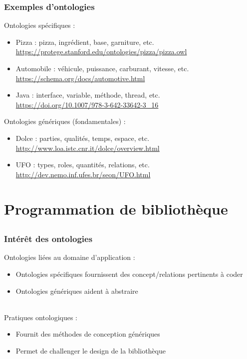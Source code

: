 \documentclass[draft]{beamer}
\begin{document}
\begin{frame}
\frametitle{Exemples d'ontologies}
Ontologies spécifiques :
\begin{itemize}
 \item Pizza : pizza, ingrédient, base, garniture, etc.\\
       {\scriptsize\url{https://protege.stanford.edu/ontologies/pizza/pizza.owl}}
 \item Automobile : véhicule, puissance, carburant, vitesse, etc.\\
       {\footnotesize\url{https://schema.org/docs/automotive.html}}
 \item Java : interface, variable, méthode, thread, etc.\\
       {\footnotesize\url{https://doi.org/10.1007/978-3-642-33642-3_16}}
\end{itemize}
Ontologies génériques (fondamentales) :
\begin{itemize}
 \item Dolce : parties, qualités, temps, espace, etc.\\
       {\footnotesize\url{http://www.loa.istc.cnr.it/dolce/overview.html}}
 \item UFO : types, roles, quantités, relations, etc.\\
       {\footnotesize\url{http://dev.nemo.inf.ufes.br/seon/UFO.html}}
\end{itemize}
\end{frame}

\section{Programmation de bibliothèque}
\subsection{}

\begin{frame}
\frametitle{Intérêt des ontologies}
Ontologies liées au domaine d'application :
\begin{itemize}
 \item Ontologies spécifiques fournissent des concept/relations pertinents à coder
 \item Ontologies génériques aident à abstraire
\end{itemize}
~\\
Pratiques ontologiques : 
\begin{itemize}
 \item Fournit des méthodes de conception génériques
 \item Permet de challenger le design de la bibliothèque
\end{itemize}
\end{frame}
\end{document}
